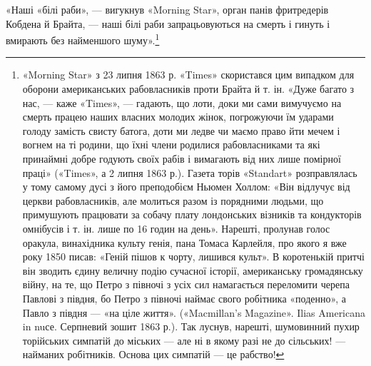 \parcont{}  %
«Наші «білі раби», — вигукнув «Morning Star», орган панів
фритредерів Кобдена й Брайта, — наші білі раби запрацьовуються
на смерть і гинуть і вмирають без найменшого шуму».\footnote{
«Morning Star» з 23 липня 1863 р. «Times» скористався цим випадком
для оборони американських рабовласників проти Брайта й т. ін.
«Дуже багато з нас, — каже «Times», — гадають, що лоти, доки ми сами
вимучуємо на смерть працею наших власних молодих жінок, погрожуючи
їм ударами голоду замість свисту батога, доти ми ледве чи маємо право
йти мечем і вогнем на ті родини, що їхні члени родилися рабовласниками
та які принаймні добре годують своїх рабів і вимагають від них лише
помірної праці» («Times», а 2 липня 1863 р.). Газета торів «Standart»
розправлялась у тому самому дусі з його преподобієм Ньюмен Холлом:
«Він відлучує від церкви рабовласників, але молиться разом із порядними
людьми, що примушують працювати за собачу плату лондонських візників
та кондукторів омнібусів і т. ін. лише по 16 годин на день». Нарешті,
пролунав голос оракула, винахідника культу генія, пана Томаса Карлейля,
про якого я вже року 1850 писав: «Геній пішов к чорту, лишився культ».
В коротенькій притчі він зводить єдину величну подію сучасної історії,
американську громадянську війну, на те, що Петро з півночі з усіх сил
намагається переломити черепа Павлові з півдня, бо Петро з півночі
наймає свого робітника «поденно», а Павло з півдня — «на ціле життя».
(«Macmillan’s Magazine». Ilias Americana in nuсе. Серпневий зошит
1863 р.). Так луснув, нарешті, шумовинний пухир торійських симпатій
до міських — але ні в якому разі не до сільських! — найманих робітників.
Основа цих симпатій — це рабство!
}


